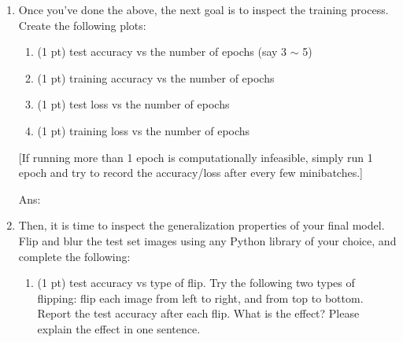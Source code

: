 \documentclass[10pt,letter,notitlepage]{article}
\newcommand{\red}[1]{{\color{red}#1}}
\newcommand{\ans}[1]{{\color{orange}\textsf{Ans}: #1}}
\newcounter{exercise}
\begin{document}
\begin{exercise}
\begin{enumerate}[label=\alph*)]
		For your convenience, we list the details of the VGG11 architecture here.
		The convolutional layers are denoted as \texttt{Conv(number of input channels, number of output channels, kernel size, stride, padding)};
		the batch normalization layers  are denoted as \texttt{BatchNorm(number of channels)};
		the max-pooling layers are denoted as \texttt{MaxPool(kernel size, stride)};
		the fully-connected layers are denoted as \texttt{FC(number of input features, number of output features)};
		the drop out layers are denoted as \texttt{Dropout(dropout ratio)}:
		\begin{verbatim}
		- Conv(001, 064, 3, 1, 1) - BatchNorm(064) - ReLU - MaxPool(2, 2)
		- Conv(064, 128, 3, 1, 1) - BatchNorm(128) - ReLU - MaxPool(2, 2)
		- Conv(128, 256, 3, 1, 1) - BatchNorm(256) - ReLU 
		- Conv(256, 256, 3, 1, 1) - BatchNorm(256) - ReLU - MaxPool(2, 2)
		- Conv(256, 512, 3, 1, 1) - BatchNorm(512) - ReLU 
		- Conv(512, 512, 3, 1, 1) - BatchNorm(512) - ReLU - MaxPool(2, 2)
		- Conv(512, 512, 3, 1, 1) - BatchNorm(512) - ReLU 
		- Conv(512, 512, 3, 1, 1) - BatchNorm(512) - ReLU - MaxPool(2, 2)
		- FC(0512, 4096) - ReLU - Dropout(0.5) 
		- FC(4096, 4096) - ReLU - Dropout(0.5) 
		- FC(4096, 10)
		\end{verbatim}
		You should use the cross-entropy loss at the end.
		
		[This experiment will take up to 1 hour on a CPU, so please be cautious of your time. If this running time is not bearable, you may cut the training set to 1/10, so only have $\sim$600 images per class instead of the regular $\sim$6000.]
		
		\item Once you've done the above, the next goal is to inspect the training process. Create the following plots:
      \begin{enumerate}[label=(\roman*)]
			\item (1 pt) test accuracy vs the number of epochs (say 3 $\sim$ 5)
			\item (1 pt) training accuracy vs the number of epochs
			\item (1 pt) test loss vs the number of epochs
			\item (1 pt) training loss vs the number of epochs
		\end{enumerate}
		[If running more than 1 epoch is computationally infeasible, simply run 1 epoch and try to record the accuracy/loss after every few minibatches.]
		
		\ans{}
		
		\item Then, it is time to inspect the generalization properties of your final model. Flip and blur the \red{test set images} using any Python library of your choice, and complete the following:		
      \begin{enumerate}[label=(\roman*)]
			\item (1 pt) test accuracy vs type of flip. Try the following two types of flipping: flip each image from left to right, and from top to bottom. Report the test accuracy after each flip. What is the effect? Please explain the effect in one sentence.
			

\end{enumerate}
\end{enumerate}
\end{exercise}
\end{document}
